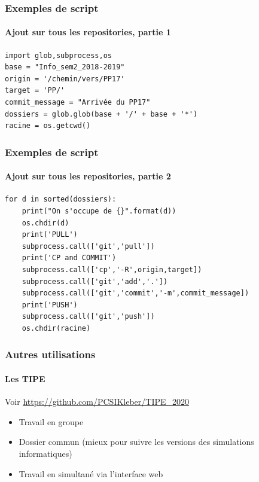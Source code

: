 \begin{frame}[fragile]
	\frametitle{Exemples de script}
	\framesubtitle{Ajout sur tous les repositories, partie 1}

	\begin{code}
	\begin{verbatim}
import glob,subprocess,os
base = "Info_sem2_2018-2019"
origin = '/chemin/vers/PP17'
target = 'PP/'
commit_message = "Arrivée du PP17"
dossiers = glob.glob(base + '/' + base + '*')
racine = os.getcwd()
	\end{verbatim}
	\end{code}
\end{frame}



\begin{frame}[fragile]
	\frametitle{Exemples de script}
	\framesubtitle{Ajout sur tous les repositories, partie 2}

	\begin{code}
	\begin{verbatim}
for d in sorted(dossiers):
    print("On s'occupe de {}".format(d))
    os.chdir(d)
    print('PULL')
    subprocess.call(['git','pull'])
    print('CP and COMMIT')
    subprocess.call(['cp','-R',origin,target])
    subprocess.call(['git','add','.'])
    subprocess.call(['git','commit','-m',commit_message])
    print('PUSH')
    subprocess.call(['git','push'])
    os.chdir(racine)
	\end{verbatim}
	\end{code}
\end{frame}



\begin{frame}
	\frametitle{Autres utilisations}
	\framesubtitle{Les TIPE}

	\begin{center}
		Voir \url{https://github.com/PCSIKleber/TIPE_2020}
	\end{center}

	\begin{itemize}[<+->]
		\item Travail en groupe

		\item Dossier commun (mieux pour suivre les versions des simulations informatiques)

		\item Travail en simultané via l'interface web
	\end{itemize}
\end{frame}


